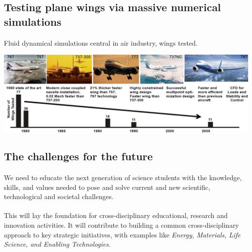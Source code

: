 \documentclass[%
oneside,                 %
final,                   %
10pt]{article}
\begin{document}
\subsection*{Testing plane wings via massive numerical simulations}

\paragraph{}
Fluid dynamical simulations central in air industry, wings tested.


\centerline{\includegraphics[width=1.0\linewidth]{fig-future/fig8.jpg}}





\subsection*{The challenges for the future}

\paragraph{}
We need to educate the next generation of 
science students with the knowledge, skills, and values needed to pose
and solve current and new scientific, technological and societal
challenges.



\paragraph{}
This will lay the foundation for cross-disciplinary
educational, research and innovation activities. It will contribute to building a common cross-disciplinary
approach to key strategic initiatives, with examples like \emph{Energy, Materials, Life Science, and Enabling Technologies}.
\end{document}
